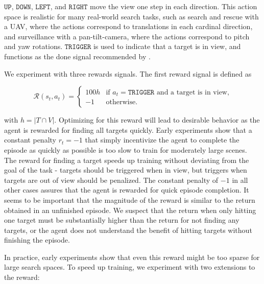 \(\mathtt{UP}\), \(\mathtt{DOWN}\), \(\mathtt{LEFT}\), and \(\mathtt{RIGHT}\) move the view one step in each direction.
This action space is realistic for many real-world search tasks,
such as search and rescue with a UAV, where the actions correspond to translations in each cardinal direction,
and surveillance with a pan-tilt-camera, where the actions correspond to pitch and yaw rotations.
\(\mathtt{TRIGGER}\) is used to indicate that a target is in view, and functions as the done signal recommended by \cite{anderson_evaluation_2018}.

We experiment with three rewards signals.
The first reward signal is defined as

\begin{equation*}
    \mathcal{R}(s_t, a_t) =
    \begin{cases}
        100h & \text{if \(a_t = \mathtt{TRIGGER}\) and a target is in view,} \\
        -1   & \text{otherwise.}
    \end{cases}
\end{equation*}


with \(h = \left\lvert T \cap V \right\rvert\). 
Optimizing for this reward will lead to desirable behavior as the agent is rewarded for finding all targets quickly.
Early experiments show that a constant penalty \(r_t = -1\) that simply incentivize the agent to complete the episode as quickly as possible is too slow to train for moderately large scenes.
The reward for finding a target speeds up training without deviating from the goal of the task -
targets should be triggered when in view, but triggers when targets are out of view should be penalized.
The constant penalty of \(-1\) in all other cases assures that the agent is rewarded for quick episode completion.
It seems to be important that the magnitude of the reward is similar to the return obtained in an unfinished episode.
We suspect that the return when only hitting one target must be substantially higher than the return for not finding any targets,
or the agent does not understand the benefit of hitting targets without finishing the episode. 

In practice, early experiments show that even this reward might be too sparse for large search spaces.
To speed up training, we experiment with two extensions to the reward:

